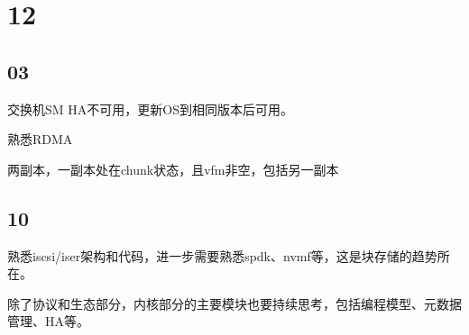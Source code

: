 \section{12}

\subsection{03}

交换机SM HA不可用，更新OS到相同版本后可用。

熟悉RDMA

两副本，一副本处在chunk状态，且vfm非空，包括另一副本

\subsection{10}

熟悉iscsi/iser架构和代码，进一步需要熟悉spdk、nvmf等，这是块存储的趋势所在。

除了协议和生态部分，内核部分的主要模块也要持续思考，包括编程模型、元数据管理、HA等。
